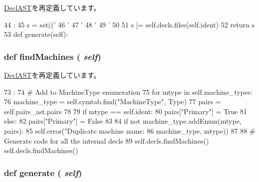 \hyperlink{classslicc_1_1ast_1_1DeclAST_1_1DeclAST_a35b1a87f6fcbddeb5b793b0e415765f8}{DeclAST}を再定義しています。


\begin{DoxyCode}
44                                 :
45         s = set(('%
46                  '%
47                  '%
48                  '%
49                  '%
50 
51         s |= self.decls.files(self.ident)
52         return s
53 
    def generate(self):
\end{DoxyCode}
\hypertarget{classslicc_1_1ast_1_1MachineAST_1_1MachineAST_a716f8a2874cc6a4d0c5ed3c2f90f236d}{
\subsubsection[{findMachines}]{\setlength{\rightskip}{0pt plus 5cm}def findMachines ( {\em self})}}
\label{classslicc_1_1ast_1_1MachineAST_1_1MachineAST_a716f8a2874cc6a4d0c5ed3c2f90f236d}


\hyperlink{classslicc_1_1ast_1_1DeclAST_1_1DeclAST_a716f8a2874cc6a4d0c5ed3c2f90f236d}{DeclAST}を再定義しています。


\begin{DoxyCode}
73                           :
74         # Add to MachineType enumeration
75         for mtype in self.machine_types:
76             machine_type = self.symtab.find("MachineType", Type)
77             pairs = self.pairs_ast.pairs
78 
79             if mtype == self.ident:
80                 pairs["Primary"] = True
81             else:
82                 pairs["Primary"] = False
83 
84             if not machine_type.addEnum(mtype, pairs):
85                 self.error("Duplicate machine name: %
86                             machine_type, mtype))
87 
88         # Generate code for all the internal decls
89         self.decls.findMachines()
        self.decls.findMachines()
\end{DoxyCode}
\hypertarget{classslicc_1_1ast_1_1MachineAST_1_1MachineAST_a4555d1cee0dccf3942ea35fe86de2e8e}{
\subsubsection[{generate}]{\setlength{\rightskip}{0pt plus 5cm}def generate ( {\em self})}}
\label{classslicc_1_1ast_1_1MachineAST_1_1MachineAST_a4555d1cee0dccf3942ea35fe86de2e8e}



